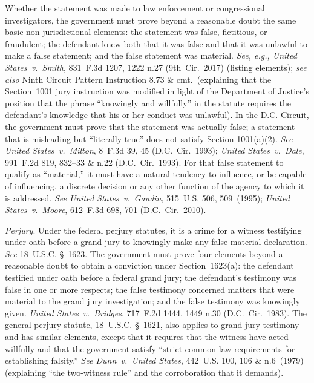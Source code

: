 Whether the statement was made to law enforcement or congressional investigators, the government must prove beyond a reasonable doubt the same basic non-jurisdictional elements: the statement was false, fictitious, or fraudulent; the defendant knew both that it was false and that it was unlawful to make a false statement; and the false statement was material.
\textit{See, e.g., United States~v.\ Smith}, 831~F.3d 1207, 1222 n.27 (9th~Cir.~2017) (listing elements); \textit{see also} Ninth Circuit Pattern Instruction 8.73 \& cmt.\ (explaining that the Section~1001 jury instruction was modified in light of the Department of Justice's position that the phrase ``knowingly and willfully'' in the statute requires the defendant's knowledge that his or her conduct was unlawful).
In the D.C. Circuit, the government must prove that the statement was actually false; a statement that is misleading but ``literally true'' does not satisfy Section 1001(a)(2).
\textit{See United States~v.\ Milton}, 8~F.3d 39, 45 (D.C.~Cir.~1993); \textit{United States~v.\ Dale}, 991~F.2d 819, 832--33 \& n.22 (D.C.~Cir.~1993).
For that false statement to qualify as ``material,'' it must have a natural tendency to influence, or be capable of influencing, a discrete decision or any other function of the agency to which it is addressed.
\textit{See United States~v.\ Gaudin}, 515~U.S. 506, 509~(1995); \textit{United States~v.\ Moore}, 612~F.3d 698, 701 (D.C.~Cir.~2010).

\textit{Perjury}.
Under the federal perjury statutes, it is a crime for a witness testifying under oath before a grand jury to knowingly make any false material declaration.
\textit{See} 18~U.S.C. \S~1623.
The government must prove four elements beyond a reasonable doubt to obtain a conviction under Section~1623(a): the defendant testified under oath before a federal grand jury; the defendant's testimony was false in one or more respects; the false testimony concerned matters that were material to the grand jury investigation; and the false testimony was knowingly given.
\textit{United States~v.\ Bridges}, 717~F.2d 1444, 1449 n.30 (D.C.~Cir.~1983).
The general perjury statute, 18~U.S.C. \S~1621, also applies to grand jury testimony and has similar elements, except that it requires that the witness have acted willfully and that the government satisfy ``strict common-law requirements for establishing falsity.''
\textit{See Dunn~v.\ United States}, 442~U.S. 100, 106 \& n.6~(1979) (explaining ``the two-witness rule'' and the corroboration that it demands).


